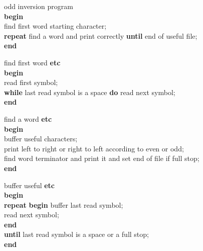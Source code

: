 \documentclass[openany,nobib]{tufte-book}
\newcommand{\kw}[1]{{\bf #1}}
\begin{document}
\noindent odd inversion program\\
\-\hspace{0.2cm} \kw{begin} \\
\-\hspace{0.4cm} find first word starting character;\\
\-\hspace{0.4cm} \kw{repeat} find a word and print correctly \kw{until} end of
useful file;\\
\-\hspace{0.2cm} \kw{end}

\bigskip

\noindent find first word \kw{etc} \\
\-\hspace{0.2cm} \kw{begin} \\
\-\hspace{0.4cm} read first symbol;\\
\-\hspace{0.4cm} \kw{while} last read symbol is a space \kw{do} read next
symbol;\\
\-\hspace{0.2cm} \kw{end}

\bigskip

\noindent find a word \kw{etc} \\
\-\hspace{0.2cm} \kw{begin} \\
\-\hspace{0.4cm} buffer useful characters;\\
\-\hspace{0.4cm} print left to right or right to left according to even or
odd;\\
\-\hspace{0.4cm} find word terminator and print it and set end of file if full
stop;\\
\-\hspace{0.2cm} \kw{end}

\bigskip

\noindent buffer useful \kw{etc} \\
\-\hspace{0.2cm} \kw{begin} \\
\-\hspace{0.4cm} \kw{repeat} \kw{begin} buffer last read symbol;\\
\-\hspace{0.7cm} read next symbol;\\
\-\hspace{0.7cm} \kw{end} \\
\-\hspace{0.4cm} \kw{until} last read symbol is a space or a full stop;\\
\-\hspace{0.2cm} \kw{end}
\end{document}
